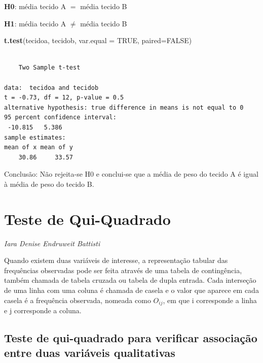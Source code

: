 \documentclass[12pt,portuguese,oneside]{book}
\newenvironment{Shaded}{\begin{snugshade}}{\end{snugshade}}
\newcommand{\KeywordTok}[1]{\textcolor[rgb]{0.13,0.29,0.53}{\textbf{#1}}}
\newcommand{\DataTypeTok}[1]{\textcolor[rgb]{0.13,0.29,0.53}{#1}}
\newcommand{\OtherTok}[1]{\textcolor[rgb]{0.56,0.35,0.01}{#1}}
\newcommand{\NormalTok}[1]{#1}
\begin{document}
\textbf{H0}: média tecido A \(=\) média tecido B

\textbf{H1}: média tecido A \(\neq\) média tecido B

\begin{Shaded}
\begin{Highlighting}[]
\KeywordTok{t.test}\NormalTok{(tecidoa, tecidob, }\DataTypeTok{var.equal =} \OtherTok{TRUE}\NormalTok{, }\DataTypeTok{paired=}\OtherTok{FALSE}\NormalTok{)}
\end{Highlighting}
\end{Shaded}

\begin{verbatim}

    Two Sample t-test

data:  tecidoa and tecidob
t = -0.73, df = 12, p-value = 0.5
alternative hypothesis: true difference in means is not equal to 0
95 percent confidence interval:
 -10.815   5.386
sample estimates:
mean of x mean of y 
    30.86     33.57 
\end{verbatim}

Conclusão: Não rejeita-se H0 e conclui-se que a média de peso do tecido
A é igual à média de peso do tecido B.

\hypertarget{qui}{\chapter{Teste de Qui-Quadrado}\label{qui}}

\emph{Iara Denise Endruweit Battisti}

\begin{flushright}
\emph{}
\end{flushright}

Quando existem duas variáveis de interesse, a representação tabular das
frequências observadas pode ser feita através de uma tabela de
contingência, também chamada de tabela cruzada ou tabela de dupla
entrada. Cada interseção de uma linha com uma coluna é chamada de casela
e o valor que aparece em cada casela é a frequência observada, nomeada
como \(O_{ij}\), em que i corresponde a linha e j corresponde a coluna.

\section{Teste de qui-quadrado para verificar associação entre duas
variáveis
qualitativas}\label{teste-de-qui-quadrado-para-verificar-associacao-entre-duas-variaveis-qualitativas}
\end{document}
